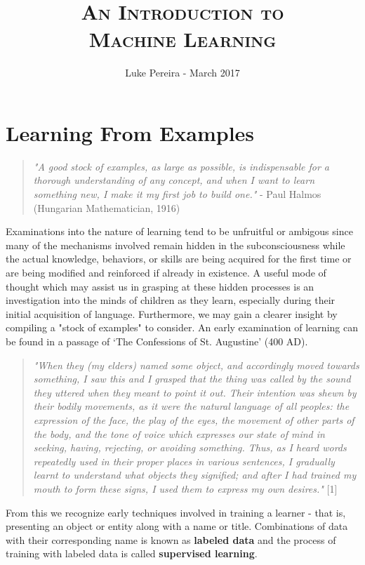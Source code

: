 \documentclass[12pt]{article}
\title{\textsc {An Introduction to \\ Machine Learning}}
\author{Luke Pereira - March 2017 }
\date{}
\begin{document}
\maketitle
\section*{Learning From Examples}

\begin{quotation}
\noindent
\textit{
"A good stock of examples, as large as possible, is indispensable for a thorough understanding of any concept, and when I want to learn something new, I make it my first job to build one."} - Paul Halmos (Hungarian Mathematician, 1916)
\end{quotation}
\noindent
Examinations into the nature of learning tend to be unfruitful or ambigous since many of the mechanisms involved remain hidden in the subconsciousness while the actual knowledge, behaviors, or skills are being acquired for the first time or are being modified and reinforced if already in existence. A useful mode of thought which may assist us in grasping at these hidden processes is an investigation into the minds of children as they learn, especially during their initial acquisition of language. Furthermore, we may gain a clearer insight by compiling a "stock of examples" to consider. An early examination of learning can be found in a passage of `The Confessions of St. Augustine' (400 AD).  
\begin{quotation}
\noindent
\textit{
"When they (my elders) named some object, and accordingly moved towards something, I saw this and I grasped that the thing was called by the sound they uttered when they meant to point it out. Their intention was shewn by their bodily movements, as it were the natural language of all peoples: the expression of the face, the play of the eyes, the movement of other parts of the body, and the tone of voice which expresses our state of mind in seeking, having, rejecting, or avoiding something. Thus, as I heard words repeatedly used in their proper places in various sentences, I gradually learnt to understand what objects they signified; and after I had trained my mouth to form these signs, I used them to express my own desires."} [1]

\end{quotation}
From this we recognize early techniques involved in training a learner - that is, presenting an object or entity along with a name or title. Combinations of data with their corresponding name is known as \textbf{labeled data} and the process of training with labeled data is called \textbf{supervised learning}. 
\end{document}
